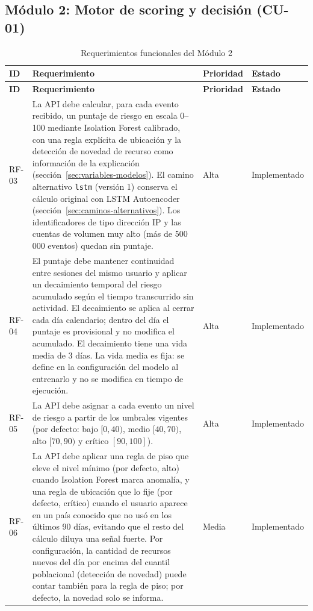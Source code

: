 \subsection{Módulo 2: Motor de scoring y decisión (CU-01)}
\begin{tablacompacta}
\begin{longtable}{P{1.1cm}P{9.3cm}C{1.6cm}P{2.6cm}}
	\caption{Requerimientos funcionales del Módulo 2}
	\label{tab:rf-modulo2}\\
	\hline
	\textbf{ID} & \textbf{Requerimiento} & \textbf{Prioridad} & \textbf{Estado} \\
	\hline
	\endfirsthead
	\hline
	\textbf{ID} & \textbf{Requerimiento} & \textbf{Prioridad} & \textbf{Estado} \\
	\hline
	\endhead
	RF-03 & La API debe calcular, para cada evento recibido, un puntaje de riesgo en escala 0--100 mediante Isolation Forest calibrado, con una regla explícita de ubicación y la detección de novedad de recurso como información de la explicación (sección~\ref{sec:variables-modelos}). El camino alternativo \texttt{lstm} (versión 1) conserva el cálculo original con LSTM Autoencoder (sección~\ref{sec:caminos-alternativos}). Los identificadores de tipo dirección IP y las cuentas de volumen muy alto (más de 500\,000 eventos) quedan sin puntaje. & Alta & Implementado \\
	\hline
	RF-04 & El puntaje debe mantener continuidad entre sesiones del mismo usuario y aplicar un decaimiento temporal del riesgo acumulado según el tiempo transcurrido sin actividad. El decaimiento se aplica al cerrar cada día calendario; dentro del día el puntaje es provisional y no modifica el acumulado. El decaimiento tiene una vida media de 3 días. La vida media es fija: se define en la configuración del modelo al entrenarlo y no se modifica en tiempo de ejecución. & Alta & Implementado \\
	\hline
	RF-05 & La API debe asignar a cada evento un nivel de riesgo a partir de los umbrales vigentes (por defecto: bajo $[0,40)$, medio $[40,70)$, alto $[70,90)$ y crítico $[90,100]$). & Alta & Implementado \\
	\hline
	RF-06 & La API debe aplicar una regla de piso que eleve el nivel mínimo (por defecto, alto) cuando Isolation Forest marca anomalía, y una regla de ubicación que lo fije (por defecto, crítico) cuando el usuario aparece en un país conocido que no usó en los últimos 90 días, evitando que el resto del cálculo diluya una señal fuerte. Por configuración, la cantidad de recursos nuevos del día por encima del cuantil poblacional (detección de novedad) puede contar también para la regla de piso; por defecto, la novedad solo se informa. & Media & Implementado \\

\end{longtable}
\end{tablacompacta}

